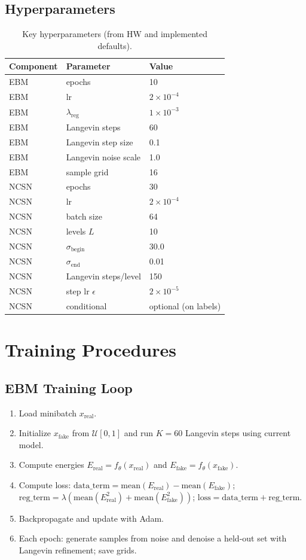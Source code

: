 \documentclass[conference]{IEEEtran}
\begin{document}
\subsection{Hyperparameters}
\begin{table}[H]
\centering
\caption{Key hyperparameters (from HW and implemented defaults).}
\begin{tabular}{lll}
\toprule
Component & Parameter & Value \\
\midrule
EBM & epochs & 10 \\
EBM & lr & $2 \times 10^{-4}$ \\
EBM & $\lambda_{\text{reg}}$ & $1 \times 10^{-3}$ \\
EBM & Langevin steps & 60 \\
EBM & Langevin step size & 0.1 \\
EBM & Langevin noise scale & 1.0 \\
EBM & sample grid & 16 \\
NCSN & epochs & 30 \\
NCSN & lr & $2 \times 10^{-4}$ \\
NCSN & batch size & 64 \\
NCSN & levels $L$ & 10 \\
NCSN & $\sigma_{\text{begin}}$ & 30.0 \\
NCSN & $\sigma_{\text{end}}$ & 0.01 \\
NCSN & Langevin steps/level & 150 \\
NCSN & step lr $\epsilon$ & $2 \times 10^{-5}$ \\
NCSN & conditional & optional (on labels) \\
\bottomrule
\end{tabular}
\end{table}

\section{Training Procedures}
\subsection{EBM Training Loop}
\begin{enumerate}[leftmargin=*]
    \item Load minibatch $x_{\text{real}}$.
    \item Initialize $x_{\text{fake}}$ from $\mathcal{U}[0,1]$ and run $K=60$ Langevin steps using current model.
    \item Compute energies $E_{\text{real}} = f_\theta(x_{\text{real}})$ and $E_{\text{fake}} = f_\theta(x_{\text{fake}})$.
    \item Compute loss: $\text{data\_term} = \text{mean}(E_{\text{real}}) - \text{mean}(E_{\text{fake}})$; $\text{reg\_term} = \lambda (\text{mean}(E_{\text{real}}^2) + \text{mean}(E_{\text{fake}}^2))$; $\text{loss} = \text{data\_term} + \text{reg\_term}$.
    \item Backpropagate and update with Adam.
    \item Each epoch: generate samples from noise and denoise a held-out set with Langevin refinement; save grids.
\end{enumerate}
\end{document}

